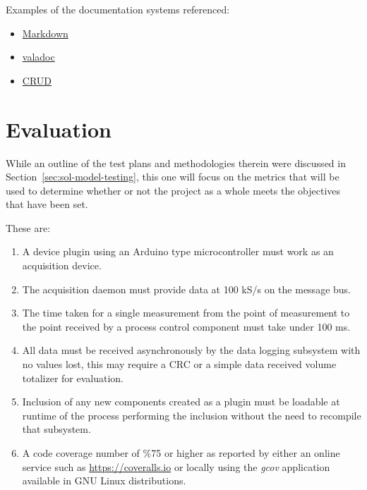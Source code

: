 \documentclass[11pt]{article}
\begin{document}
    Examples of the documentation systems referenced:

    \begin{itemize}
      \item \href{https://en.wikipedia.org/wiki/Markdown}{Markdown}
      \item \href{http://valadoc.org}{valadoc}
      \item \href{http://theforeman.org/api/1.11/index.html}{CRUD}
    \end{itemize}

  \newpage

  \section{Evaluation}\label{sec:eval}

    While an outline of the test plans and methodologies therein were discussed
    in Section~\ref{sec:sol-model-testing}, this one will focus on the metrics
    that will be used to determine whether or not the project as a whole meets
    the objectives that have been set.

    These are:

    \begin{enumerate}
      \item A device plugin using an Arduino type microcontroller must work as
            an acquisition device.
      \item The acquisition daemon must provide data at 100 kS/s on the message
            bus.
      \item The time taken for a single measurement from the point of
            measurement to the point received by a process control component
            must take under 100 ms.
      \item All data must be received asynchronously by the data logging
            subsystem with no values lost, this may require a CRC or a simple
            data received volume totalizer for evaluation.
      \item Inclusion of any new components created as a plugin must be
            loadable at runtime of the process performing the inclusion without
            the need to recompile that subsystem.
      \item A code coverage number of \%75 or higher as reported by either an
            online service such as \url{https://coveralls.io} or locally using
            the \emph{gcov} application available in GNU Linux distributions.
    \end{enumerate}
\end{document}

